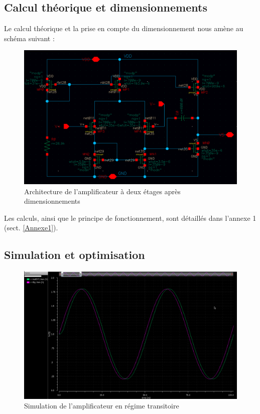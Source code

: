 \documentclass[11pt]{article}
\begin{document}
\subsection{Calcul th\'eorique et dimensionnements}

Le calcul th\'eorique et la prise en compte du dimensionnement nous am\`ene au sch\'ema
suivant :

\begin{figure}[!htb]
\begin{center}
  \includegraphics[width=\linewidth]{amplificateur_.png}
  \caption{Architecture de l'amplificateur \`a deux \'etages apr\`es dimensionnements}
\end{center}
\end{figure}

Les calculs, ainsi que le principe de fonctionnement, sont d\'etaill\'es dans l'annexe 1 (sect. \ref{Annexe1}). 
 
\clearpage

\subsection{Simulation et optimisation}

\begin{figure}[!htb]
\begin{center}
  \includegraphics[width=0.85\linewidth]{reponse_ampli.png}
  \caption{Simulation de l'amplificateur en r\'egime transitoire}
  \label{fig:figSimAmp}
\end{center}
\end{figure}
\end{document}
